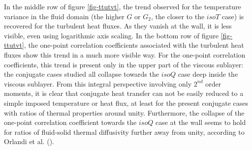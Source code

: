 \documentclass[review]{elsarticle}
\begin{document}

In the middle row of figure \ref{fig-ttutvt}, the trend observed for the temperature variance in the fluid domain (the higher $G$ or $G_2$, the closer to the $isoT$ case) is recovered for the turbulent heat fluxes.
As they vanish at the wall, it is less visible, even using logarithmic axis scaling.
In the bottom row of figure \ref{fig-ttutvt}, the one-point correlation coefficients associated with the turbulent heat fluxes show this trend in a much more visible way.
For the one-point correlation coefficients, this trend is present only in the upper part of the viscous sublayer: the conjugate cases studied all collapse towards the $isoQ$ case deep inside the viscous sublayer.
From this integral perspective involving only $2^{nd}$ order moments, it is clear that conjugate heat transfer can not be easily reduced to a simple imposed temperature or heat flux, at least for the present conjugate cases with ratios of thermal properties around unity.
Furthermore, the collapse of the one-point correlation coefficient towards the $isoQ$ case at the wall seems to hold for ratios of fluid-solid thermal diffusivity further away from unity, according to Orlandi et al. (\cite{orlandi2016dns}).



\end{document}
